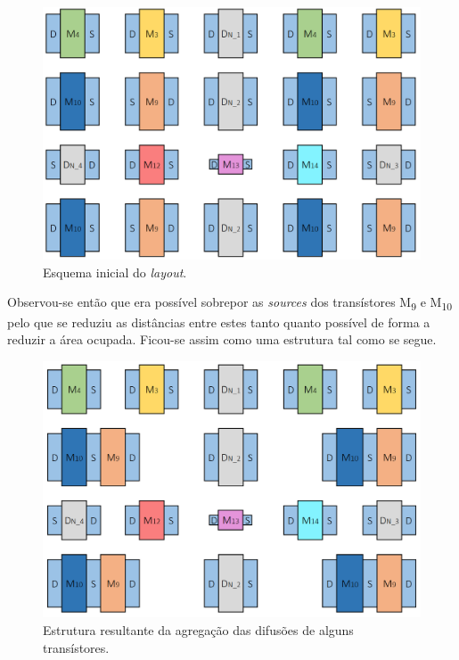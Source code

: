 \documentclass[11pt]{article}
\numberwithin{equation}{section}
\begin{document}
\begin{figure}[H]
	\centering
	\includegraphics[keepaspectratio=true, scale=0.30]{teoricas/layout/cc4_1}
	\vspace{-0.5em}
	\caption{Esquema inicial do \textit{layout}.}
	\vspace{-0.8em} 
\end{figure}

Observou-se então que era possível sobrepor as \textit{sources} dos transístores M\textsubscript{9} e M\textsubscript{10} pelo que se reduziu as distâncias entre estes tanto quanto possível de forma a reduzir a área ocupada. Ficou-se assim como uma estrutura tal como se segue.

\begin{figure}[H]
	\centering
	\includegraphics[keepaspectratio=true, scale=0.30]{teoricas/layout/cc4_2}
	\vspace{-0.5em}
	\caption{Estrutura resultante da agregação das difusões de alguns transístores.}
	\vspace{-0.8em} 
\end{figure}
\end{document}
